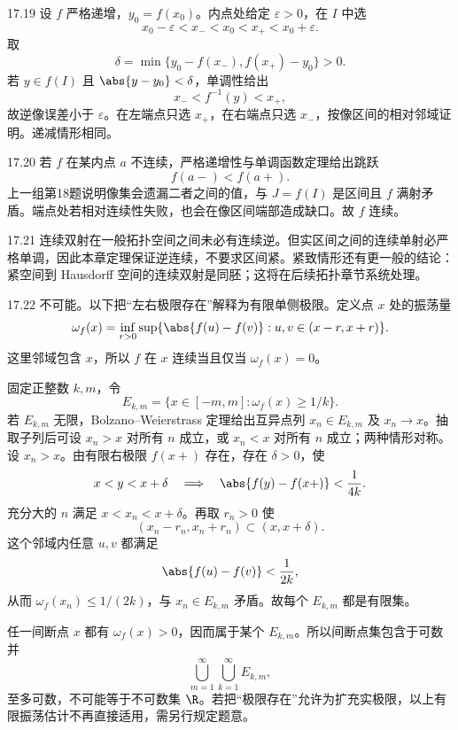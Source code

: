 \begin{solution}{17.19}
设 \(f\) 严格递增，\(y_0=f(x_0)\)。内点处给定 \(\varepsilon>0\)，在 \(I\) 中选
\[
 x_0-\varepsilon<x_-<x_0<x_+<x_0+\varepsilon.
\]
取
\[
 \delta=\min\{y_0-f(x_-),f(x_+)-y_0\}>0.
\]
若 \(y\in f(I)\) 且 \(\abs{y-y_0}<\delta\)，单调性给出
\[
 x_-<f^{-1}(y)<x_+,
\]
故逆像误差小于 \(\varepsilon\)。在左端点只选 \(x_+\)，在右端点只选 \(x_-\)，按像区间的相对邻域证明。递减情形相同。
\end{solution}

\begin{solution}{17.20}
若 \(f\) 在某内点 \(a\) 不连续，严格递增性与单调函数定理给出跳跃
\[
 f(a-)<f(a+).
\]
上一组第18题说明像集会遗漏二者之间的值，与 \(J=f(I)\) 是区间且 \(f\) 满射矛盾。端点处若相对连续性失败，也会在像区间端部造成缺口。故 \(f\) 连续。
\end{solution}

\begin{solution}{17.21}
连续双射在一般拓扑空间之间未必有连续逆。但实区间之间的连续单射必严格单调，因此本章定理保证逆连续，不要求区间紧。紧致情形还有更一般的结论：紧空间到 Hausdorff 空间的连续双射是同胚；这将在后续拓扑章节系统处理。
\end{solution}

\begin{solution}{17.22}
不可能。以下把“左右极限存在”解释为有限单侧极限。定义点 \(x\) 处的振荡量
\[
 \omega_f(x)=\inf_{r>0}
 \sup\{\abs{f(u)-f(v)}:u,v\in(x-r,x+r)\}.
\]
这里邻域包含 \(x\)，所以 \(f\) 在 \(x\) 连续当且仅当 \(\omega_f(x)=0\)。

固定正整数 \(k,m\)，令
\[
 E_{k,m}=\{x\in[-m,m]:\omega_f(x)\ge 1/k\}.
\]
若 \(E_{k,m}\) 无限，Bolzano--Weierstrass 定理给出互异点列
\(x_n\in E_{k,m}\) 及 \(x_n\to x\)。抽取子列后可设 \(x_n>x\) 对所有 \(n\) 成立，或 \(x_n<x\) 对所有 \(n\) 成立；两种情形对称。设 \(x_n>x\)。由有限右极限 \(f(x+)\) 存在，存在 \(\delta>0\)，使
\[
 x<y<x+\delta
 \quad\Longrightarrow\quad
 \abs{f(y)-f(x+)}<\frac1{4k}.
\]
充分大的 \(n\) 满足 \(x<x_n<x+\delta\)。再取 \(r_n>0\) 使
\[
 (x_n-r_n,x_n+r_n)\subset(x,x+\delta).
\]
这个邻域内任意 \(u,v\) 都满足
\[
 \abs{f(u)-f(v)}<\frac1{2k},
\]
从而 \(\omega_f(x_n)\le1/(2k)\)，与 \(x_n\in E_{k,m}\) 矛盾。故每个 \(E_{k,m}\) 都是有限集。

任一间断点 \(x\) 都有 \(\omega_f(x)>0\)，因而属于某个 \(E_{k,m}\)。所以间断点集包含于可数并
\[
 \bigcup_{m=1}^{\infty}\bigcup_{k=1}^{\infty}E_{k,m},
\]
至多可数，不可能等于不可数集 \(\R\)。若把“极限存在”允许为扩充实极限，以上有限振荡估计不再直接适用，需另行规定题意。
\end{solution}

